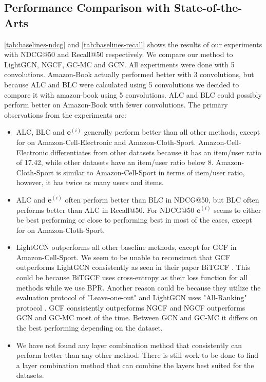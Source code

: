 \subsection{Performance Comparison with State-of-the-Arts}
\autoref{tab:baselines-ndcg} and \autoref{tab:baselines-recall} shows the results of our experiments with NDCG@50 and Recall@50 respectively.
We compare our method to LightGCN, NGCF, GC-MC and GCN.
All experiments were done with 5 convolutions. 
Amazon-Book actually performed better with 3 convolutions, but because ALC and BLC were calculated using 5 convolutions we decided to compare it with amazon-book using 5 convolutions.
ALC and BLC could possibly perform better on Amazon-Book with fewer convolutions.
The primary observations from the experiments are:
\begin{itemize}
    \item ALC, BLC and $\mathbf{e}^{(i)}$ generally perform better than all other methods, except for on Amazon-Cell-Electronic and Amazon-Cloth-Sport. Amazon-Cell-Electronic differentiates from other datasets because it has an item/user ratio of 17.42, while other datasets have an item/user ratio below 8. Amazon-Cloth-Sport is similar to Amazon-Cell-Sport in terms of item/user ratio, however, it has twice as many users and items.
    \item ALC and $\mathbf{e}^{(i)}$ often perform better than BLC in NDCG@50, but BLC often performs better than ALC in Recall@50. For NDCG@50 $\mathbf{e}^{(i)}$ seems to either be best performing or close to performing best in most of the cases, except for on Amazon-Cloth-Sport.
    \item LightGCN outperforms all other baseline methods, except for GCF in Amazon-Cell-Sport. We seem to be unable to reconstruct that GCF outperforms LightGCN consistently as seen in their paper BiTGCF \cite{BiTGCF}. This could be because BiTGCF uses cross-entropy as their loss function for all methods while we use BPR. Another reason could be because they utilize the evaluation protocol of "Leave-one-out" and LightGCN uses "All-Ranking" protocol \cite{BiTGCF,lightgcn}. GCF consistently outperforms NGCF and NGCF outperforms GCN and GC-MC most of the time. Between GCN and GC-MC it differs on the best performing depending on the dataset.
    \item We have not found any layer combination method that consistently can perform better than any other method. There is still work to be done to find a layer combination method that can combine the layers best suited for the datasets.
\end{itemize}
